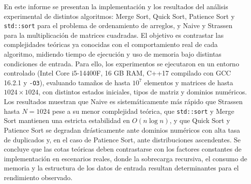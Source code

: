 En este informe se presentan la implementación y los resultados del análisis experimental de distintos algoritmos: Merge Sort, Quick Sort, Patience Sort y \texttt{std::sort} para el problema de ordenamiento de arreglos, y Naive y Strassen para la multiplicación de matrices cuadradas. El objetivo es contrastar las complejidades teóricas ya conocidas con el comportamiento real de cada algoritmo, midiendo tiempo de ejecución y uso de memoria bajo distintas condiciones de entrada. Para ello, los experimentos se ejecutaron en un entorno controlado (Intel Core i5-14400F, 16 GB RAM, C++17 compilado con GCC 16.2.1 y \texttt{-O3}), evaluando tamaños de hasta $10^7$ elementos y matrices de hasta $1024 \times 1024$, con distintos estados iniciales, tipos de matriz y dominios numéricos. Los resultados muestran que Naive es sistemáticamente más rápido que Strassen hasta $N=1024$ pese a su menor complejidad teórica, que \texttt{std::sort} y Merge Sort mantienen una estricta estabilidad en $O(n \log n)$, y que Quick Sort y Patience Sort se degradan drásticamente ante dominios numéricos con alta tasa de duplicados y, en el caso de Patience Sort, ante distribuciones ascendentes. Se concluye que las cotas teóricas deben contrastarse con los factores constantes de implementación en escenarios reales, donde la sobrecarga recursiva, el consumo de memoria y la estructura de los datos de entrada resultan determinantes para el rendimiento observado.
